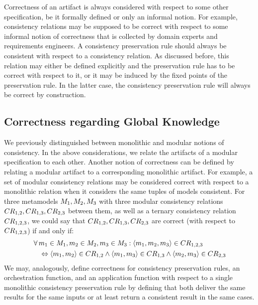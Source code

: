 Correctness of an artifact is always considered with respect to some other specification, be it formally defined or only an informal notion.
For example, consistency relations may be supposed to be correct with respect to some informal notion of correctness that is collected by domain experts and requirements engineers.
A consistency preservation rule should always be consistent with respect to a consistency relation. As discussed before, this relation may either be defined explicitly and the preservation rule has to be correct with respect to it, or it may be induced by the fixed points of the preservation rule.
In the latter case, the consistency preservation rule will always be correct by construction.


\subsection{Correctness regarding Global Knowledge}

We previously distinguished between monolithic and modular notions of consistency.
In the above considerations, we relate the artifacts of a modular %
specification to each other.
Another notion of correctness can be defined by relating a modular artifact to a corresponding monolithic artifact.
For example, a set of modular consistency relations may be considered correct with respect to a monolithic relation when it considers the same tuples of models consistent.
For three metamodels $M_{1}, M_{2}, M_{3}$ with three modular consistency relations $CR_{1,2}, CR_{1,3}, CR_{2,3}$ between them, as well as a ternary consistency relation $CR_{1,2,3}$, we could say that $CR_{1,2}, CR_{1,3}, CR_{2,3}$ are correct (with respect to $CR_{1,2,3}$) if and only if:
\begin{align*}
    & \forall \model{m}{1} \in \metamodel{M}{1}, \model{m}{2} \in \metamodel{M}{2}, \model{m}{3} \in \metamodel{M}{3}: \tupled{\model{m}{1}, \model{m}{2}, \model{m}{3}} \in \consistencyrelation{CR}{1,2,3} \\
    & \formulaskip
    \equivalent \tupled{\model{m}{1}, \model{m}{2}} \in \consistencyrelation{CR}{1,2} \land \tupled{\model{m}{1}, \model{m}{3}} \in \consistencyrelation{CR}{1,3} \land \tupled{\model{m}{2}, \model{m}{3}} \in \consistencyrelation{CR}{2,3}
\end{align*}
%
We may, analogously, define correctness for consistency preservation rules, an orchestration function, and an application function with respect to a single monolithic consistency preservation rule by defining that both deliver the same results for the same inputs or at least return a consistent result in the same cases.


